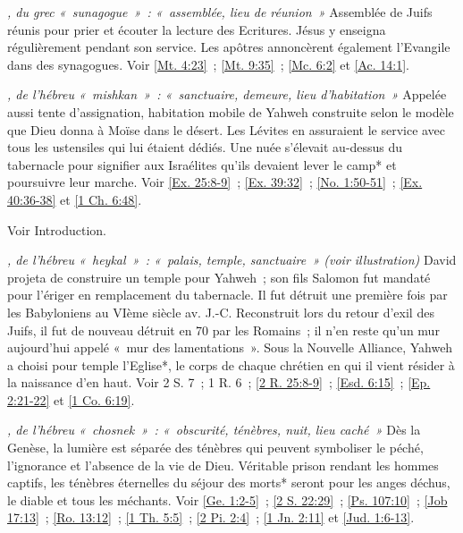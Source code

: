 \begin{multicols}{2}
\textit{, du grec «~sunagogue~»~: «~assemblée, lieu de réunion~»}\newline
Assemblée de Juifs réunis pour prier et écouter la lecture des Ecritures. Jésus y enseigna régulièrement pendant son service. Les apôtres annoncèrent également l'Evangile dans des synagogues. Voir \vref{Mt. 4:23}~; \vref{Mt. 9:35}~; \vref{Mc. 6:2} et \vref{Ac. 14:1}.

\textit{, de l'hébreu «~mishkan~»~: «~sanctuaire, demeure, lieu d'habitation~»}\newline
Appelée aussi tente d'assignation, habitation mobile de Yahweh construite selon le modèle que Dieu donna à Moïse dans le désert. Les Lévites en assuraient le service avec tous les ustensiles qui lui étaient dédiés. Une nuée s'élevait au-dessus du tabernacle pour signifier aux Israélites qu'ils devaient lever le camp* et poursuivre leur marche. Voir \vref{Ex. 25:8-9}~; \vref{Ex. 39:32}~; \vref{No. 1:50-51}~; \vref{Ex. 40:36-38} et \vref{1 Ch. 6:48}.

\textit{}\newline
Voir Introduction.

\textit{, de l'hébreu «~heykal~»~: «~palais, temple, sanctuaire~» (voir illustration)}\newline
David projeta de construire un temple pour Yahweh~; son fils Salomon fut mandaté pour l'ériger en remplacement du tabernacle. Il fut détruit une première fois par les Babyloniens au VIème siècle av. J.-C. Reconstruit lors du retour d'exil des Juifs, il fut de nouveau détruit en 70 par les Romains~; il n'en reste qu'un mur aujourd'hui appelé «~mur des lamentations~». Sous la Nouvelle Alliance, Yahweh a choisi pour temple l'Eglise*, le corps de chaque chrétien en qui il vient résider à la naissance d'en haut. Voir 2 S. 7~; 1 R. 6~; \vref{2 R. 25:8-9}~; \vref{Esd. 6:15}~; \vref{Ep. 2:21-22} et \vref{1 Co. 6:19}.

\textit{, de l'hébreu «~chosnek~»~: «~obscurité, ténèbres, nuit, lieu caché~»}\newline
Dès la Genèse, la lumière est séparée des ténèbres qui peuvent symboliser le péché, l'ignorance et l'absence de la vie de Dieu. Véritable prison rendant les hommes captifs, les ténèbres éternelles du séjour des morts* seront pour les anges déchus, le diable et tous les méchants. Voir \vref{Ge. 1:2-5}~; \vref{2 S. 22:29}~; \vref{Ps. 107:10}~; \vref{Job 17:13}~; \vref{Ro. 13:12}~; \vref{1 Th. 5:5}~; \vref{2 Pi. 2:4}~; \vref{1 Jn. 2:11} et \vref{Jud. 1:6-13}.


\end{multicols}
